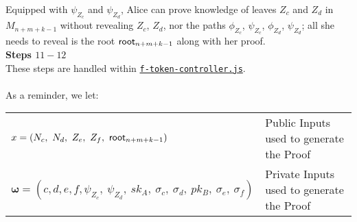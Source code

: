 \noindent
Equipped with $\psi_{Z_c}$ and $\psi_{Z_d}$, Alice can prove knowledge of leaves $Z_c$ and $Z_d$ in $M_{n+m+k-1}$ without revealing $Z_c$, $Z_d$, nor the paths $\phi_{Z_c}$, $\psi_{Z_c}$, $\phi_{Z_d}$, $\psi_{Z_d}$; all she needs to reveal is the root $\mathsf{root}_{n+m+k-1}$ along with her proof.\\

\textbf{Steps $11 - 12$}
\ \\
These steps are handled within \hyperref[sec:f-token-controller]{\texttt{f-token-controller.js}}.\\
\\
As a reminder, we let:
\begin{center}
  \begin{tabular}{l l}
    $x = (N_c,\
          N_d,\
          Z_e,\
          Z_f,\
          \mathsf{root}_{n+m+k-1})$ & Public Inputs used to generate the Proof\\
    $\bm\omega = (c, d, e, f,
              \psi_{Z_c},\
              \psi_{Z_d},\
              sk_A,\
              \sigma_c,\
              \sigma_d,\
              pk_B,\
              \sigma_e,\
              \sigma_f)$ & Private Inputs used to generate the Proof\\
  \end{tabular}
\end{center}
\ \\

